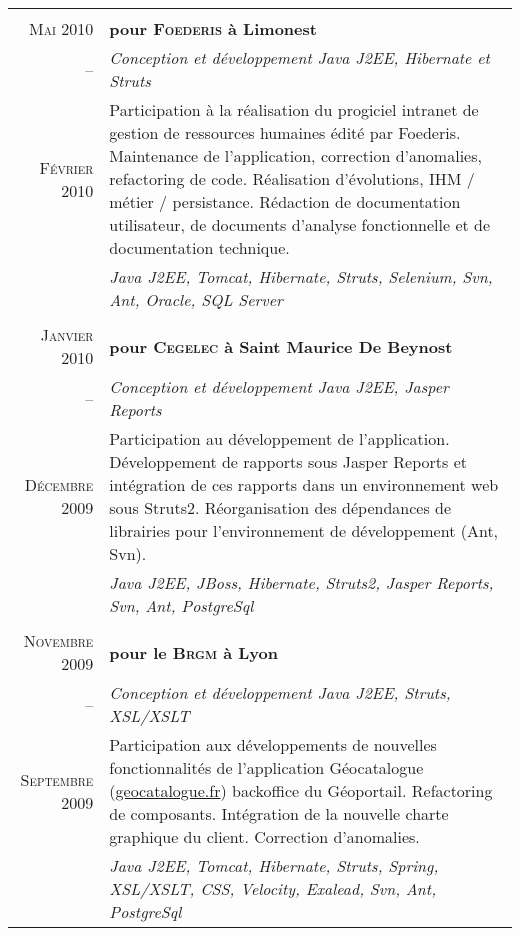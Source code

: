 \documentclass[a4paper,10pt]{article}
\begin{document}
\begin{supertabular}{r|p{11cm}}
     \\
    \textsc{Mai} 2010 & \textbf{pour \textsc{Foederis} à Limonest} \\
    -- & \emph{Conception et développement Java J2EE, Hibernate et Struts} \\
    \footnotesize{\textsc{Février 2010}} & \footnotesize{Participation à la réalisation du progiciel intranet de gestion de ressources humaines édité par Foederis. Maintenance de l’application, correction d’anomalies, refactoring de code. Réalisation d’évolutions, IHM / métier / persistance. Rédaction de documentation utilisateur, de documents d’analyse fonctionnelle et de documentation technique.} \\
    & \emph{Java J2EE, Tomcat, Hibernate, Struts, Selenium, Svn, Ant, Oracle, SQL Server} \\


     \\
    \textsc{Janvier} 2010 & \textbf{pour \textsc{Cegelec} à Saint Maurice De Beynost} \\
    -- & \emph{Conception et développement Java J2EE, Jasper Reports} \\
    \footnotesize{\textsc{Décembre 2009}}  & \footnotesize{Participation au développement de l’application. Développement de rapports sous Jasper Reports et intégration de ces rapports dans un environnement web sous Struts2. Réorganisation des dépendances de librairies pour l’environnement de développement (Ant, Svn).} \\
    & \emph{Java J2EE, JBoss, Hibernate, Struts2, Jasper Reports, Svn, Ant, PostgreSql} \\


     \\
    \textsc{Novembre} 2009 & \textbf{pour le \textsc{Brgm} à Lyon} \\
    -- & \emph{Conception et développement Java J2EE, Struts, XSL/XSLT} \\
    \footnotesize{\textsc{Septembre 2009}} & \footnotesize{Participation aux développements de nouvelles fonctionnalités de l’application Géocatalogue (\href{http://www.geocatalogue.fr}{geocatalogue.fr}) backoffice du Géoportail. Refactoring de composants. Intégration de la nouvelle charte graphique du client. Correction d’anomalies.} \\
    & \emph{Java J2EE, Tomcat, Hibernate, Struts, Spring, XSL/XSLT, CSS, Velocity, Exalead, Svn, Ant, PostgreSql} \\



\end{supertabular}
\end{document}
